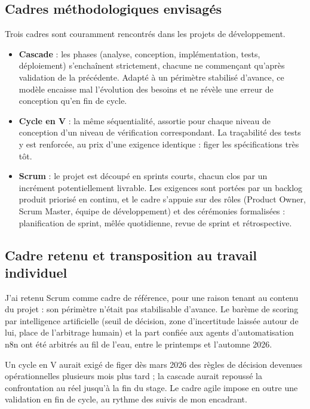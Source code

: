 \documentclass[]{./tpl/isipfe}
\begin{document}
\subsection{Cadres méthodologiques envisagés}
\label{sec_1_7_1}
Trois cadres sont couramment rencontrés dans les projets de développement.

\begin{itemize}
\item \textbf{Cascade} : les phases (analyse, conception, implémentation, tests, déploiement) s’enchaînent strictement, chacune ne commençant qu’après validation de la précédente. Adapté à un périmètre stabilisé d’avance, ce modèle encaisse mal l’évolution des besoins et ne révèle une erreur de conception qu’en fin de cycle.
\item \textbf{Cycle en V} : la même séquentialité, assortie pour chaque niveau de conception d’un niveau de vérification correspondant. La traçabilité des tests y est renforcée, au prix d’une exigence identique : figer les spécifications très tôt.
\item \textbf{Scrum} \cite{ref02} : le projet est découpé en sprints courts, chacun clos par un incrément potentiellement livrable. Les exigences sont portées par un backlog produit priorisé en continu, et le cadre s’appuie sur des rôles (Product Owner, Scrum Master, équipe de développement) et des cérémonies formalisées : planification de sprint, mêlée quotidienne, revue de sprint et rétrospective.
\end{itemize}

\subsection{Cadre retenu et transposition au travail individuel}
\label{sec_1_7_2}
J’ai retenu Scrum comme cadre de référence, pour une raison tenant au contenu du projet : son périmètre n’était pas stabilisable d’avance. Le barème de scoring par intelligence artificielle (seuil de décision, zone d’incertitude laissée autour de lui, place de l’arbitrage humain) et la part confiée aux agents d’automatisation n8n ont été arbitrés au fil de l’eau, entre le printemps et l’automne 2026.

Un cycle en V aurait exigé de figer dès mars 2026 des règles de décision devenues opérationnelles plusieurs mois plus tard ; la cascade aurait repoussé la confrontation au réel jusqu’à la fin du stage. Le cadre agile impose en outre une validation en fin de cycle, au rythme des suivis de mon encadrant.
\end{document}
